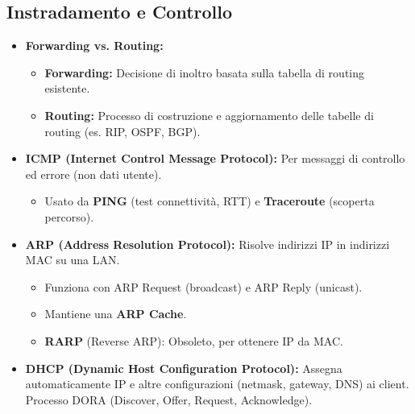 \subsection{Instradamento e Controllo}
\begin{itemize}
    \item \textbf{Forwarding vs. Routing:}
    \begin{itemize}
        \item \textbf{Forwarding:} Decisione di inoltro basata sulla tabella di routing esistente.
        \item \textbf{Routing:} Processo di costruzione e aggiornamento delle tabelle di routing (es. RIP, OSPF, BGP).
    \end{itemize}
    \item \textbf{ICMP (Internet Control Message Protocol):} Per messaggi di controllo ed errore (non dati utente).
    \begin{itemize}
        \item Usato da \textbf{PING} (test connettività, RTT) e \textbf{Traceroute} (scoperta percorso).
    \end{itemize}
    \item \textbf{ARP (Address Resolution Protocol):} Risolve indirizzi IP in indirizzi MAC su una LAN.
    \begin{itemize}
        \item Funziona con ARP Request (broadcast) e ARP Reply (unicast).
        \item Mantiene una \textbf{ARP Cache}.
        \item \textbf{RARP} (Reverse ARP): Obsoleto, per ottenere IP da MAC.
    \end{itemize}
    \item \textbf{DHCP (Dynamic Host Configuration Protocol):} Assegna automaticamente IP e altre configurazioni (netmask, gateway, DNS) ai client. Processo DORA (Discover, Offer, Request, Acknowledge).
\end{itemize}

